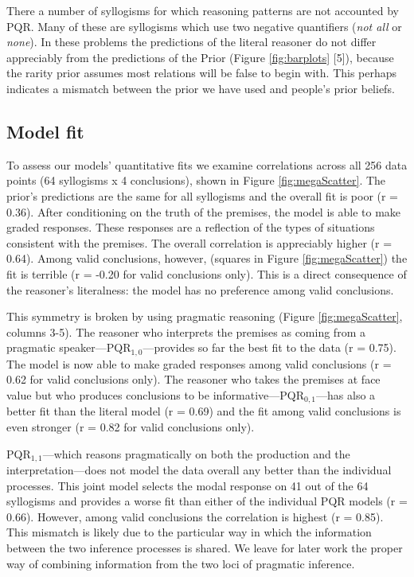 \documentclass[10pt,letterpaper]{article}
\begin{document}
There a number of syllogisms for which reasoning patterns are not accounted by PQR. Many of these are syllogisms which use two negative quantifiers (\emph{not all} or \emph{none}). In these problems the predictions of the literal reasoner do not differ appreciably from the predictions of the Prior (Figure \ref{fig:barplots} [5]), because the rarity prior assumes most relations will be false to begin with. This perhaps indicates a mismatch between the prior we have used and people's prior beliefs.

\subsection{Model fit}

To assess our models' quantitative fits we examine correlations across all 256 data points (64 syllogisms x 4 conclusions), shown in Figure \ref{fig:megaScatter}.
%
The prior's predictions are the same for all syllogisms and the overall fit is poor (r = 0.36).  After conditioning on the truth of the premises, the model is able to make graded responses. These responses are a reflection of the types of situations consistent with the premises. The overall correlation is appreciably higher (r = 0.64). Among valid conclusions, however, (squares in Figure \ref{fig:megaScatter}) the fit is terrible (r = -0.20 for valid conclusions only). This is a direct consequence of the reasoner's literalness: the model has no preference among valid conclusions.

This symmetry is broken by using pragmatic reasoning (Figure \ref{fig:megaScatter}, columns 3-5). The reasoner who interprets the premises as coming from a pragmatic speaker---PQR$_{1,0}$---provides so far the best fit to the data (r = 0.75). The model is now able to make graded responses among valid conclusions (r = 0.62 for valid conclusions only). The reasoner who takes the premises at face value but who produces conclusions to be informative---PQR$_{0,1}$---has also a better fit than the literal model (r = 0.69) and the fit among valid conclusions is even stronger (r = 0.82 for valid conclusions only). 

PQR$_{1,1}$---which reasons pragmatically on both the production and the interpretation---does not model the data overall any better than the individual processes. This joint model selects the modal response on 41 out of the 64 syllogisms and provides a worse fit than either of the individual PQR models (r = 0.66). However, among valid conclusions the correlation is highest (r = 0.85). This mismatch is likely due to the particular way in which the information between the two inference processes is shared.  We leave for later work the proper way of combining information from the two loci of pragmatic inference.
\end{document}
